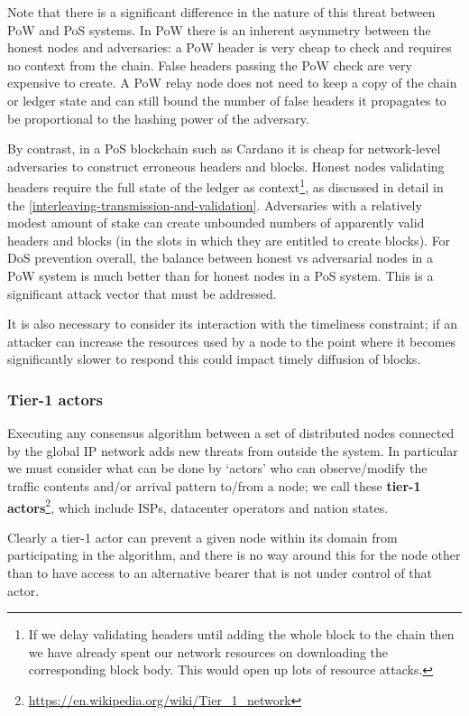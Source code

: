 \documentclass[11pt,a4paper]{article}
\begin{document}
Note that there is a significant difference in the nature of this threat
between PoW and PoS systems. In PoW there is an inherent asymmetry
between the honest nodes and adversaries: a PoW header is very cheap to
check and requires no context from the chain. False headers passing the
PoW check are very expensive to create. A PoW relay node does not need
to keep a copy of the chain or ledger state and can still bound the
number of false headers it propagates to be proportional to the hashing
power of the adversary.

By contrast, in a PoS blockchain such as Cardano it is cheap for
network-level adversaries to construct erroneous headers and blocks.
Honest nodes validating headers require the full state of the ledger as
context\footnote{If we delay validating headers until adding the whole
  block to the chain then we have already spent our network resources on
  downloading the corresponding block body. This would open up lots of
  resource attacks.}, as discussed in detail in the
\cref{interleaving-transmission-and-validation}. Adversaries with a relatively modest amount of stake can create
unbounded numbers of apparently valid headers and blocks (in the slots
in which they are entitled to create blocks). For DoS prevention
overall, the balance between honest vs adversarial nodes in a PoW system
is much better than for honest nodes in a PoS system. This is a
significant attack vector that must be addressed.

It is also necessary to consider its interaction with the timeliness
constraint; if an attacker can increase the resources used by a node to
the point where it becomes significantly slower to respond this could
impact timely diffusion of blocks.

\subsubsection{Tier-1 actors}
\label{tier-1-actors}

Executing any consensus algorithm between a set of distributed nodes
connected by the global IP network adds new threats from outside the
system. In particular we must consider what can be done by `actors' who
can observe/modify the traffic contents and/or arrival pattern to/from a
node; we call these \textbf{tier-1 actors}\footnote{\href{https://en.wikipedia.org/wiki/Tier_1_network}{{https://en.wikipedia.org/wiki/Tier\_1\_network}}},
which include ISPs, datacenter operators and nation states.

Clearly a tier-1 actor can prevent a given node within its domain from
participating in the algorithm, and there is no way around this for the
node other than to have access to an alternative bearer that is not
under control of that actor.
\end{document}
